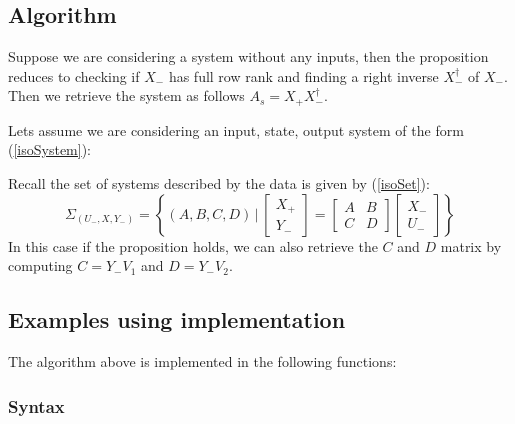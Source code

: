 \subsection{Algorithm}

Suppose we are considering a system without any inputs, then the proposition reduces to checking if $X_-$ has full row rank and finding a right inverse $X_-^\dagger$ of $X_-$. Then we retrieve the system as follows $A_s = X_+ X_-^\dagger$.

Lets assume we are considering an input, state, output system of the form (\ref{isoSystem}):

Recall the set of systems described by the data is given by (\ref{isoSet}):
\begin{equation*}
\Sigma_{(U_-,X, Y_-)} = \left\{ (A, B, C, D) \, | \, 
\begin{bmatrix} X_{+} \\ Y_{-} \end{bmatrix} = 
\begin{bmatrix} A & B \\ C & D \end{bmatrix} 
\begin{bmatrix} X_{-} \\ U_{-} \end{bmatrix} \right\} 
\end{equation*}
In this case if the proposition holds, we can also retrieve the $C$ and $D$ matrix by computing $C = Y_- V_1$ and $D = Y_- V_2$.

\subsection{Examples using implementation}
The algorithm above is implemented in the following functions:
\subsubsection*{Syntax}
 \\
 \\


